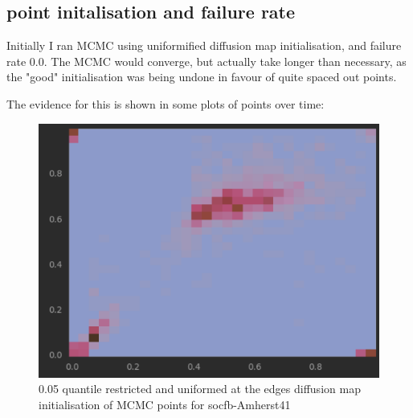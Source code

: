 \subsection{point initalisation and failure rate}
Initially I ran MCMC using uniformified diffusion map initialisation, and failure rate $0.0$. The MCMC would converge, but actually take longer than necessary, as the "good" initialisation was being undone in favour of quite spaced out points.

The evidence for this is shown in some plots of points over time:

\begin{figure}
  \centering
  \includegraphics[width=\textwidth]{figures/amherst_2d_pts_restricted.png}
  \caption{0.05 quantile restricted and uniformed at the edges diffusion map initialisation of MCMC points for socfb-Amherst41}
\end{figure}

